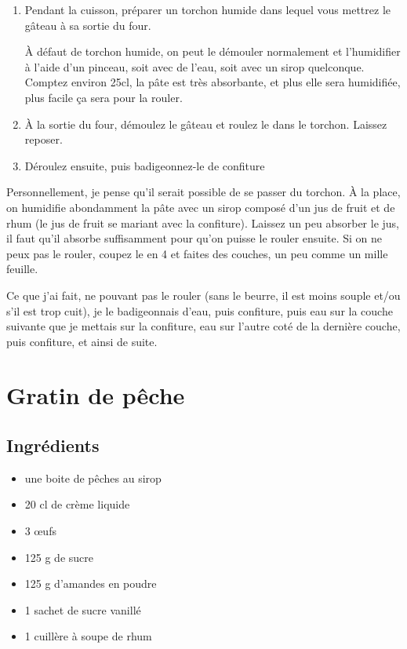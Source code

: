 \begin{enumerate}
\item Pendant la cuisson, préparer un torchon humide dans lequel vous mettrez le gâteau à sa sortie du four.
\begin{remarque}
À défaut de torchon humide, on peut le démouler normalement et l'humidifier à l'aide d'un pinceau, soit avec de l'eau, soit avec un sirop quelconque. Comptez environ 25cl, la pâte est très absorbante, et plus elle sera humidifiée, plus facile ça sera pour la rouler.
\end{remarque}
\item À la sortie du four, démoulez le gâteau et roulez le dans le torchon. Laissez reposer.
\item Déroulez ensuite, puis badigeonnez-le de confiture
\end{enumerate}

Personnellement, je pense qu'il serait possible de se passer du torchon. À la place, on humidifie abondamment la pâte avec un sirop composé d'un jus de fruit et de rhum (le jus de fruit se mariant avec la confiture). Laissez un peu absorber le jus, il faut qu'il absorbe suffisamment pour qu'on puisse le rouler ensuite. Si on ne peux pas le rouler, coupez le en 4 et faites des couches, un peu comme un mille feuille.

Ce que j'ai fait, ne pouvant pas le rouler (sans le beurre, il est moins souple et/ou s'il est trop cuit), je le badigeonnais d'eau, puis confiture, puis eau sur la couche suivante que je mettais sur la confiture, eau sur l'autre coté de la dernière couche, puis confiture, et ainsi de suite.

\newpage
\section{Gratin de pêche}
\subsection*{Ingrédients}
\begin{itemize}
\item une boite de pêches au sirop
\item 20 cl de crème liquide
\item 3 œufs 
\item 125 g de sucre 
\item 125 g d'amandes en poudre 
\item 1 sachet de sucre vanillé
\item 1 cuillère à soupe de rhum
\end{itemize}

